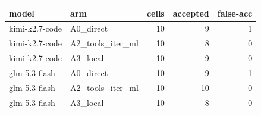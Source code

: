 \begin{tabular}{llrrr}
\toprule
\textbf{model} & \textbf{arm} & \textbf{cells} & \textbf{accepted} & \textbf{false-acc} \\
\midrule
kimi-k2.7-code & A0\_direct & 10 & 9 & 1 \\
kimi-k2.7-code & A2\_tools\_iter\_ml & 10 & 8 & 0 \\
kimi-k2.7-code & A3\_local & 10 & 9 & 0 \\
glm-5.3-flash & A0\_direct & 10 & 9 & 1 \\
glm-5.3-flash & A2\_tools\_iter\_ml & 10 & 10 & 0 \\
glm-5.3-flash & A3\_local & 10 & 8 & 0 \\
\bottomrule
\end{tabular}
